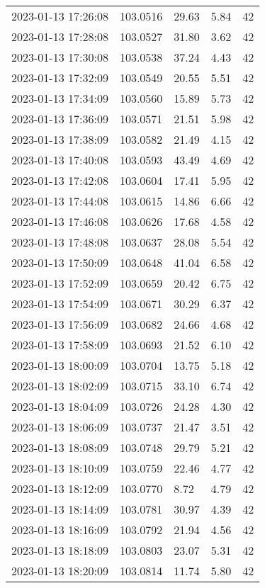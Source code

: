 \documentclass{nature_plusfigure}
\begin{document}
\begin{supplement}
\begin{center}
\begin{longtable}{lllll}
2023-01-13 17:26:08 & 103.0516 & 29.63 & 5.84 & 42 \\ 
2023-01-13 17:28:08 & 103.0527 & 31.80 & 3.62 & 42 \\ 
2023-01-13 17:30:08 & 103.0538 & 37.24 & 4.43 & 42 \\ 
2023-01-13 17:32:09 & 103.0549 & 20.55 & 5.51 & 42 \\ 
2023-01-13 17:34:09 & 103.0560 & 15.89 & 5.73 & 42 \\ 
2023-01-13 17:36:09 & 103.0571 & 21.51 & 5.98 & 42 \\ 
2023-01-13 17:38:09 & 103.0582 & 21.49 & 4.15 & 42 \\ 
2023-01-13 17:40:08 & 103.0593 & 43.49 & 4.69 & 42 \\ 
2023-01-13 17:42:08 & 103.0604 & 17.41 & 5.95 & 42 \\ 
2023-01-13 17:44:08 & 103.0615 & 14.86 & 6.66 & 42 \\ 
2023-01-13 17:46:08 & 103.0626 & 17.68 & 4.58 & 42 \\ 
2023-01-13 17:48:08 & 103.0637 & 28.08 & 5.54 & 42 \\ 
2023-01-13 17:50:09 & 103.0648 & 41.04 & 6.58 & 42 \\ 
2023-01-13 17:52:09 & 103.0659 & 20.42 & 6.75 & 42 \\ 
2023-01-13 17:54:09 & 103.0671 & 30.29 & 6.37 & 42 \\ 
2023-01-13 17:56:09 & 103.0682 & 24.66 & 4.68 & 42 \\ 
2023-01-13 17:58:09 & 103.0693 & 21.52 & 6.10 & 42 \\ 
2023-01-13 18:00:09 & 103.0704 & 13.75 & 5.18 & 42 \\ 
2023-01-13 18:02:09 & 103.0715 & 33.10 & 6.74 & 42 \\ 
2023-01-13 18:04:09 & 103.0726 & 24.28 & 4.30 & 42 \\ 
2023-01-13 18:06:09 & 103.0737 & 21.47 & 3.51 & 42 \\ 
2023-01-13 18:08:09 & 103.0748 & 29.79 & 5.21 & 42 \\ 
2023-01-13 18:10:09 & 103.0759 & 22.46 & 4.77 & 42 \\ 
2023-01-13 18:12:09 & 103.0770 & 8.72 & 4.79 & 42 \\ 
2023-01-13 18:14:09 & 103.0781 & 30.97 & 4.39 & 42 \\ 
2023-01-13 18:16:09 & 103.0792 & 21.94 & 4.56 & 42 \\ 
2023-01-13 18:18:09 & 103.0803 & 23.07 & 5.31 & 42 \\ 
2023-01-13 18:20:09 & 103.0814 & 11.74 & 5.80 & 42 \\ 

\end{longtable}
\end{center}
\end{supplement}
\end{document}
